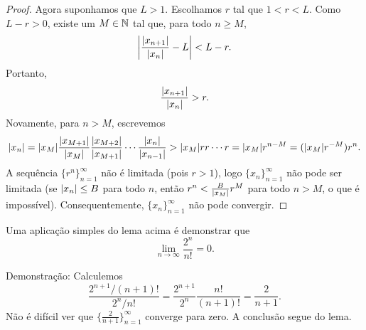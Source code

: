 \begin{proof}
Agora suponhamos que $L > 1$. Escolhamos
$r$ tal que $1 < r < L$. Como $L-r > 0$,
existe um $M \in {\mathbb{N}}$ tal que, para
todo $n \geq M$,
\begin{equation*}
\left\lvert {\frac{\lvert {x_{n+1}} \rvert}{\lvert {x_n} \rvert} - L} \right\rvert < L-r .
\end{equation*}
Portanto,
\begin{equation*}
\frac{\lvert {x_{n+1}} \rvert}{\lvert {x_n} \rvert} > r .
\end{equation*}
Novamente, para $n > M$,
escrevemos
\begin{equation*}
\lvert {x_n} \rvert =
\lvert {x_M} \rvert
\frac{\lvert {x_{M+1}} \rvert}{\lvert {x_{M}} \rvert}
\frac{\lvert {x_{M+2}} \rvert}{\lvert {x_{M+1}} \rvert}
\cdots
\frac{\lvert {x_{n}} \rvert}{\lvert {x_{n-1}} \rvert}
>
\lvert {x_M} \rvert
r r \cdots r = \lvert {x_M} \rvert r^{n-M} = (\lvert {x_M} \rvert r^{-M}) r^n .
\end{equation*}
A sequência $\{ r^n \}_{n=1}^\infty$ não é limitada (pois $r > 1$), logo
$\{x_n\}_{n=1}^\infty$ não pode ser limitada (se $\lvert {x_n} \rvert \leq B$ para todo $n$, então
$r^n < \frac{B}{\lvert {x_M} \rvert} r^{M}$ para todo $n > M$, o que é impossível).
Consequentemente, $\{ x_n \}_{n=1}^\infty$ não pode convergir.
\end{proof}

\begin{example}
Uma aplicação simples do lema acima é demonstrar que
\begin{equation*}
\lim_{n\to\infty} \frac{2^n}{n!} = 0 .
\end{equation*}

Demonstração:
Calculemos
\begin{equation*}
\frac{2^{n+1} / (n+1)!}{2^n/n!}
=
\frac{2^{n+1}}{2^n}\frac{n!}{(n+1)!}
=
\frac{2}{n+1} .
\end{equation*}
Não é difícil ver que $\bigl\{ \frac{2}{n+1} \bigr\}_{n=1}^\infty$ converge para zero.
A conclusão segue do lema.
\end{example}


